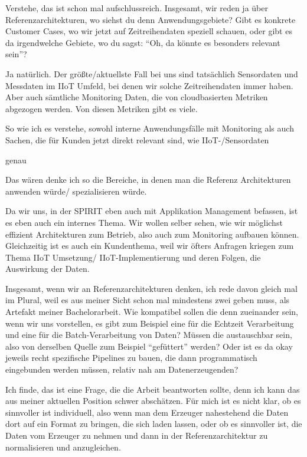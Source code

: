 \LF	 Verstehe, das ist schon mal aufschlussreich. Insgesamt, wir reden ja über Referenzarchitekturen, wo siehst du denn Anwendungsgebiete? Gibt es konkrete Customer Cases, wo wir jetzt auf Zeitreihendaten speziell schauen, oder gibt es da irgendwelche Gebiete, wo du sagst: \enquote{Oh, da könnte es besonders relevant sein}?

\PA	 Ja natürlich. Der größte/aktuellste Fall bei uns sind tatsächlich Sensordaten und Messdaten im \ac{IIoT} Umfeld, bei denen wir solche Zeitreihendaten immer haben. Aber auch sämtliche Monitoring Daten, die von cloudbasierten Metriken abgezogen werden. Von diesen Metriken gibt es viele.

\LF	So wie ich es verstehe, sowohl interne Anwendungsfälle mit Monitoring als auch Sachen, die für Kunden jetzt direkt relevant sind, wie \ac{IIoT}-/Sensordaten

\PA	 genau

\LF	 Das wären denke ich so die Bereiche, in denen man die Referenz Architekturen anwenden würde/ spezialisieren würde.

\PA	 Da wir uns, in der SPIRIT eben auch mit Applikation Management befassen, ist es eben auch ein internes Thema. Wir wollen selber sehen, wie wir möglichst effizient Architekturen zum Betrieb, also auch zum Monitoring aufbauen können. Gleichzeitig ist es auch ein Kundenthema, weil wir öfters Anfragen kriegen zum Thema \ac{IIoT} Umsetzung/ \ac{IIoT}-Implementierung und deren Folgen, die Auswirkung der Daten.

\LF	Insgesamt, wenn wir an Referenzarchitekturen denken, ich rede davon gleich mal im Plural, weil es aus meiner Sicht schon mal mindestens zwei geben muss, als Artefakt meiner Bachelorarbeit. Wie kompatibel sollen die denn zueinander sein, wenn wir uns vorstellen, es gibt zum Beispiel eine für die Echtzeit Verarbeitung und eine für die Batch-Verarbeitung von Daten? Müssen die austauschbar sein, also von derselben Quelle zum Beispiel \enquote{gefüttert} werden? Oder ist es da okay jeweils recht spezifische Pipelines zu bauen, die  dann programmatisch eingebunden werden müssen, relativ nah am Datenerzeugenden?

\PA	 Ich finde, das ist eine Frage, die die Arbeit beantworten sollte, denn ich kann das aus meiner aktuellen Position schwer abschätzen. Für mich ist es nicht klar, ob es sinnvoller ist individuell, also wenn man dem Erzeuger nahestehend die Daten dort auf ein Format zu bringen, die sich laden lassen, oder ob es sinnvoller ist, die Daten vom Erzeuger zu nehmen und dann in der Referenzarchitektur zu normalisieren und anzugleichen.

